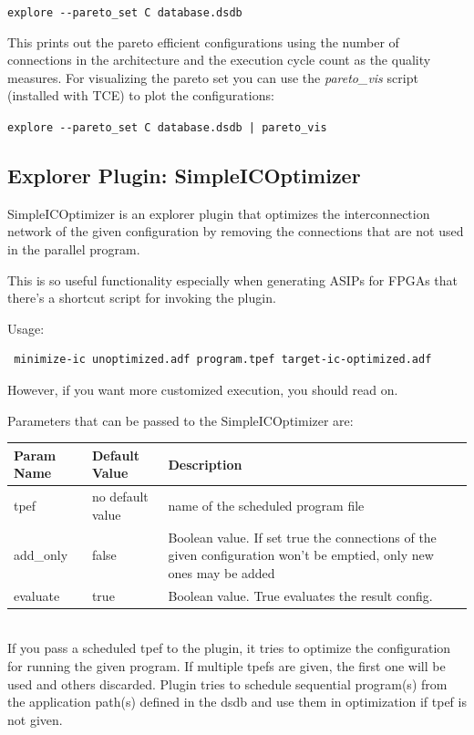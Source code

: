 \documentclass[a4paper,twoside]{tceusermanual}
\begin{document}
\verb|explore --pareto_set C database.dsdb|

This prints out the pareto efficient configurations using the
number of connections in the architecture and the execution cycle count as
the quality measures. For visualizing the pareto set you can use the
\textit{pareto\_vis} script (installed with TCE) to plot the configurations:

\verb#explore --pareto_set C database.dsdb | pareto_vis#

\subsection{Explorer Plugin: SimpleICOptimizer}

SimpleICOptimizer is an explorer plugin that optimizes the interconnection
network of the given configuration by removing the connections that are not
used in the parallel program. 

This is so useful functionality especially when generating ASIPs for
FPGAs that there's a shortcut script for invoking the plugin.

Usage: 
\begin{verbatim}
 minimize-ic unoptimized.adf program.tpef target-ic-optimized.adf
\end{verbatim}

However, if you want more customized execution, you should read on.

Parameters that can be passed to the
SimpleICOptimizer are:

\begin{tabular}{p{}p{}
                p{}}
\textbf{Param Name} &\textbf{Default Value} &\textbf{Description} \\
\hline
tpef & no default value &  name of the scheduled program file \\
add\_only & false &  Boolean value. If set true the connections of the given 
configuration won't be emptied, only new ones may be added\\
evaluate & true &  Boolean value. True evaluates the result config. \\
\end{tabular}\\

If you pass a scheduled tpef to the plugin, it tries to optimize the configuration
for running the given program. If multiple tpefs are given, the first one will be used
and others discarded.
Plugin tries to schedule sequential program(s) from the application path(s) defined in
the dsdb and use them in optimization if tpef is not given.
\end{document}
